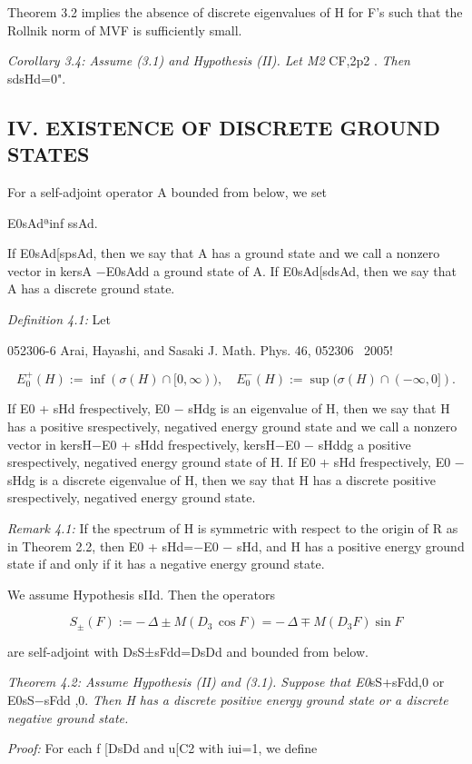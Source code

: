\documentclass{article}
\begin{document}
Theorem 3.2 implies the absence of discrete eigenvalues of H for F's such that the Rollnik norm of MVF is sufficiently small.

\textit{Corollary 3.4: Assume (3.1) and Hypothesis (II). Let M2} CF,2p2 . \textit{Then} sdsHd=0".

\subsection{\textbf{IV. EXISTENCE OF DISCRETE GROUND STATES}}

For a self-adjoint operator A bounded from below, we set

E0sAdªinf ssAd.

If E0sAd[spsAd, then we say that A has a ground state and we call a nonzero vector in kersA −E0sAdd a ground state of A. If E0sAd[sdsAd, then we say that A has a discrete ground state.

\textit{Definition 4.1:} Let

052306-6 Arai, Hayashi, and Sasaki J. Math. Phys. 46, 052306 ~2005!

$$E_{0}^{+}(H)\!:=\inf(\sigma(H)\cap[0,\infty)),\quad E_{0}^{-}(H)\!:=\sup(\sigma(H)\cap(-\infty,0]).\tag{4.1}$$

If E0 + sHd frespectively, E0 − sHdg is an eigenvalue of H, then we say that H has a positive srespectively, negatived energy ground state and we call a nonzero vector in kersH−E0 + sHdd frespectively, kersH−E0 − sHddg a positive srespectively, negatived energy ground state of H. If E0 + sHd frespectively, E0 − sHdg is a discrete eigenvalue of H, then we say that H has a discrete positive srespectively, negatived energy ground state.

\textit{Remark 4.1:} If the spectrum of H is symmetric with respect to the origin of R as in Theorem 2.2, then E0 + sHd=−E0 − sHd, and H has a positive energy ground state if and only if it has a negative energy ground state.

We assume Hypothesis sIId. Then the operators

$$S_{\pm}(F):=-\,\Delta\pm M(D_{3}\,\cos F)=-\,\Delta\mp M(D_{3}F)\sin F\tag{4.2}$$

are self-adjoint with DsS±sFdd=DsDd and bounded from below.

\textit{Theorem 4.2: Assume Hypothesis (II) and (3.1). Suppose that E0}sS+sFdd,0 or E0sS−sFdd ,0. \textit{Then H has a discrete positive energy ground state or a discrete negative ground state.}

\textit{Proof:} For each f [DsDd and u[C2 with iui=1, we define
\end{document}
